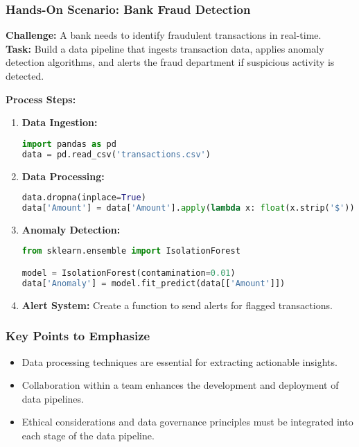 \documentclass{beamer}
\begin{document}
\begin{frame}[fragile]
    \frametitle{Hands-On Scenario: Bank Fraud Detection}
    \textbf{Challenge:} A bank needs to identify fraudulent transactions in real-time. \\
    \textbf{Task:} Build a data pipeline that ingests transaction data, applies anomaly detection algorithms, and alerts the fraud department if suspicious activity is detected.

    \textbf{Process Steps:}
    \begin{enumerate}
        \item \textbf{Data Ingestion:} 
        \begin{lstlisting}[language=Python]
import pandas as pd
data = pd.read_csv('transactions.csv')
        \end{lstlisting}
        
        \item \textbf{Data Processing:} 
        \begin{lstlisting}[language=Python]
data.dropna(inplace=True)
data['Amount'] = data['Amount'].apply(lambda x: float(x.strip('$')))
        \end{lstlisting}
        
        \item \textbf{Anomaly Detection:} 
        \begin{lstlisting}[language=Python]
from sklearn.ensemble import IsolationForest

model = IsolationForest(contamination=0.01)
data['Anomaly'] = model.fit_predict(data[['Amount']])
        \end{lstlisting}
        
        \item \textbf{Alert System:} Create a function to send alerts for flagged transactions.
    \end{enumerate}
\end{frame}

\begin{frame}
    \frametitle{Key Points to Emphasize}
    \begin{itemize}
        \item Data processing techniques are essential for extracting actionable insights.
        \item Collaboration within a team enhances the development and deployment of data pipelines.
        \item Ethical considerations and data governance principles must be integrated into each stage of the data pipeline.
    \end{itemize}
\end{frame}
\end{document}
